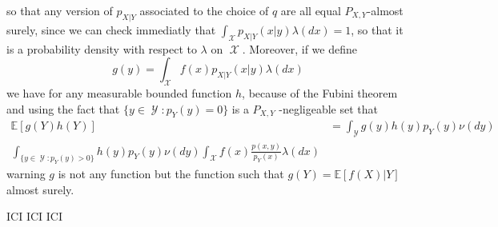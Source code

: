 \documentclass[
	fontsize=11pt, %
	twoside=false, %
	numbers=noenddot, %
]{kaobook}
\DeclareMathOperator{\cX}{\mathcal X}
\DeclareMathOperator{\cY}{\mathcal Y}
\newcommand{\E}{\mathbb E}
\begin{document}
so that any version of $p_{X | Y}$ associated to the choice of $q$ are all equal $P_{X, Y}$-almost surely, since we can check immediatly that $\int_{\cX} p_{X | Y}(x | y) \lambda(dx) = 1$, so that it is a probability density with respect to $\lambda$ on $\cX$.
Moreover, if we define
\begin{equation*}
	g(y) = \int_{\cX} f(x) p_{X | Y}(x | y) \lambda(dx)
\end{equation*}
we have for any measurable bounded function $h$, because of the Fubini theorem and using the fact that $\{y \in \cY : p_Y(y) = 0\}$ is a $P_{X, Y}$ -negligeable set that
\begin{align*}
	\E[ g(Y) h(Y)] &= \int_{\cY} g(y) h(y) p_Y(y) \nu(dy) \\
	\int_{\{ y \in \cY : p_Y(y) > 0 \}} h(y) p_Y(y) \nu(dy) \int_{\cX} f(x) \frac{p(x, y)}{p_Y(x)} \lambda (dx)
\end{align*}
warning $g$ is not any function but the function such that $g(Y) = \E[ f(X) | Y]$ almost surely.

ICI ICI ICI





\printbibliography[heading=bibintoc, title=Bibliography] %



\end{document}
